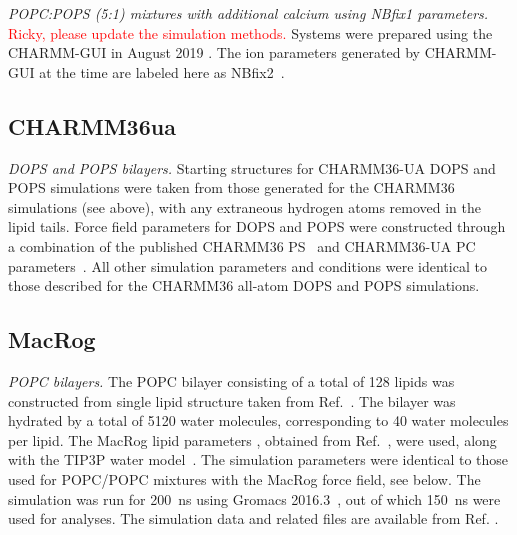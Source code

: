 \documentclass[journal=jpcbfk,manuscript=article]{achemso}
\newcommand{\todo}[1]{\textcolor{red}{#1}}
\begin{document}
\noindent
{\it POPC:POPS (5:1) mixtures with additional calcium using NBfix1 parameters.}
\todo{Ricky, please update the simulation methods.}
Systems were prepared using the CHARMM-GUI in August 2019 \cite{lee16,jo18}.
The ion parameters generated by CHARMM-GUI at the time are labeled here as NBfix2~\cite{han2018graph}.

\subsection{CHARMM36ua}
\noindent
{\it DOPS and POPS bilayers.} 
Starting structures for CHARMM36-UA DOPS and POPS simulations were taken from those generated for the CHARMM36 simulations (see above),
with any extraneous hydrogen atoms removed in the lipid tails. Force field parameters for DOPS and POPS were constructed through a
combination of the published CHARMM36 PS~\cite{venable13} and CHARMM36-UA PC parameters~\cite{lee14}.
All other simulation parameters and conditions were identical to those described for the CHARMM36 all-atom DOPS and POPS simulations.


\subsection{MacRog}
\noindent
{\it POPC bilayers.} 
The POPC bilayer consisting of a total of 128 lipids was constructed from single lipid structure taken 
from Ref.~. The bilayer was hydrated by a total of 5120 water 
molecules, corresponding to 40 water molecules per lipid.
The MacRog lipid parameters \cite{kulig15b}, obtained from Ref.~, were used,
along with the TIP3P water model~\cite{jorgensen83}. The simulation parameters were identical to those used for 
POPC/POPC mixtures with the MacRog force field, see below. The simulation was run for 200~ns using Gromacs 2016.3~\cite{abraham2015gromacs}, 
out of which 150~ns were used for analyses. The simulation data and related files are available from Ref. .
\end{document}

